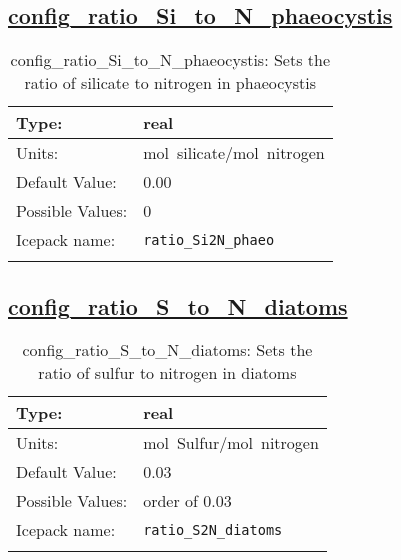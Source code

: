 \subsection[config\_ratio\_Si\_to\_N\_phaeocystis]{\hyperref[sec:nm_tab_biogeochemistry]{config\_ratio\_Si\_to\_N\_phaeocystis}}
\label{subsec:nm_sec_config_ratio_Si_to_N_phaeocystis}
\begin{center}
\begin{longtable}{| p{2.0in} || p{4.0in} |}
    \hline
    Type: & real \\
    \hline
    Units: & \si{mol.silicate/mol.nitrogen} \\
    \hline
    Default Value: & 0.00 \\
    \hline
    Possible Values: & 0 \\
    \hline
    Icepack name: & \verb+ratio_Si2N_phaeo+ \\
    \hline
    \caption{config\_ratio\_Si\_to\_N\_phaeocystis: Sets the ratio of silicate to nitrogen in phaeocystis}
\end{longtable}
\end{center}
\subsection[config\_ratio\_S\_to\_N\_diatoms]{\hyperref[sec:nm_tab_biogeochemistry]{config\_ratio\_S\_to\_N\_diatoms}}
\label{subsec:nm_sec_config_ratio_S_to_N_diatoms}
\begin{center}
\begin{longtable}{| p{2.0in} || p{4.0in} |}
    \hline
    Type: & real \\
    \hline
    Units: & \si{mol.Sulfur/mol.nitrogen} \\
    \hline
    Default Value: & 0.03 \\
    \hline
    Possible Values: & order of 0.03 \\
    \hline
    Icepack name: & \verb+ratio_S2N_diatoms+ \\
    \hline
    \caption{config\_ratio\_S\_to\_N\_diatoms: Sets the ratio of sulfur to nitrogen in diatoms}
\end{longtable}
\end{center}

